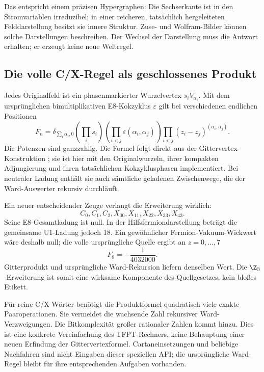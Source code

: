 Das entspricht einem präzisen Hypergraphen: Die Sechserkante ist in den Stromvariablen irreduzibel; in einer reicheren, tatsächlich hergeleiteten Felddarstellung besitzt sie innere Struktur. Zuse- und Wolfram-Bilder können solche Darstellungen beschreiben. Der Wechsel der Darstellung muss die Antwort erhalten; er erzeugt keine neue Weltregel.

\subsection{Die volle C/X-Regel als geschlossenes Produkt}
Jedes Originalfeld ist ein phasenmarkierter Wurzelvertex $s_iV_{\alpha_i}$. Mit dem ursprünglichen bimultiplikativen E8-Kokzyklus $\varepsilon$ gilt bei verschiedenen endlichen Positionen
\begin{equation}\label{eq:latticeoracle}
F_n=\delta_{\sum_i\alpha_i,0}
\left(\prod_i s_i\right)
\left(\prod_{i<j}\varepsilon(\alpha_i,\alpha_j)\right)
\prod_{i<j}(z_i-z_j)^{(\alpha_i,\alpha_j)}.
\end{equation}
Die Potenzen sind ganzzahlig. Die Formel folgt direkt aus der Gittervertex-Konstruktion \cite{frenkelkac}; sie ist hier mit den Originalwurzeln, ihrer kompakten Adjungierung und ihren tatsächlichen Kokzyklusphasen implementiert. Bei neutraler Ladung enthält sie auch sämtliche geladenen Zwischenwege, die der Ward-Auswerter rekursiv durchläuft.

Ein neuer entscheidender Zeuge verlangt die Erweiterung wirklich:
\begin{equation}
C_0,C_1,C_2,X_{00},X_{11},X_{22},X_{33},X_{43}.
\end{equation}
Seine E8-Gesamtladung ist null. In der Hilfsfermiondarstellung beträgt die gemeinsame U1-Ladung jedoch 18. Ein gewöhnlicher Fermion-Vakuum-Wickwert wäre deshalb null; die volle ursprüngliche Quelle ergibt an $z=0,\ldots,7$
\begin{equation}
F_8=-\frac1{4032000}.
\end{equation}
Gitterprodukt und ursprüngliche Ward-Rekursion liefern denselben Wert. Die $\Z_3$-Erweiterung ist somit eine wirksame Komponente des Quellgesetzes, kein bloßes Etikett.

Für reine C/X-Wörter benötigt die Produktformel quadratisch viele exakte Paaroperationen. Sie vermeidet die wachsende Zahl rekursiver Ward-Verzweigungen. Die Bitkomplexität großer rationaler Zahlen kommt hinzu. Dies ist eine konkrete Vereinfachung des TFPT-Rechners, keine Behauptung einer neuen Erfindung der Gittervertexformel. Cartaneinsetzungen und beliebige Nachfahren sind nicht Eingaben dieser speziellen API; die ursprüngliche Ward-Regel bleibt für ihre entsprechenden Aufgaben vorhanden.

